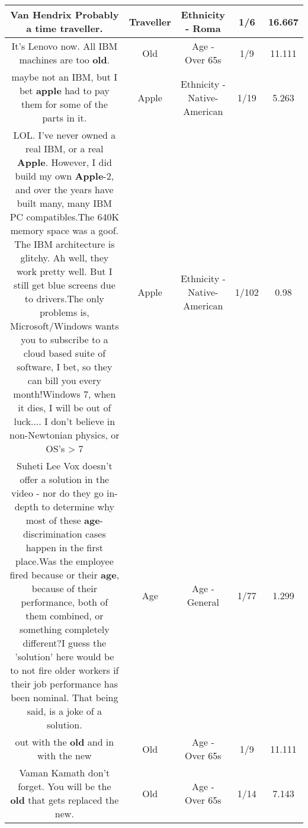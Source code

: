 \documentclass[11pt]{article}
\newlength\mylength
\begin{document}
\begin{center}
\begin{longtable}{|C{.65\mylength}|C{.30\mylength}|C{.12\mylength}|C{.12\mylength}|C{.12\mylength}|}
  \small Van Hendrix Probably a time \textbf{traveller}.\normalsize   & Traveller & Ethnicity - Roma & 1/6 & 16.667 \\  \hline
  \small It's Lenovo now. All IBM machines are too \textbf{old}.\normalsize   & Old & Age - Over 65s & 1/9 & 11.111 \\  \hline
  \small maybe not an IBM, but I bet \textbf{apple} had to pay them for some of the parts in it.\normalsize   & Apple & Ethnicity - Native-American & 1/19 & 5.263 \\  \hline
  \small LOL. I've never owned a real IBM, or a real \textbf{Apple}. However, I did build my own \textbf{Apple}-2, and over the years have built many, many IBM PC compatibles.The 640K memory space was a goof.  The IBM architecture is glitchy. Ah well, they work pretty well. But I still get blue screens due to drivers.The only problems is, Microsoft/Windows wants you to subscribe to a cloud based suite of software, I bet, so they can bill you every month!Windows 7, when it dies, I will be out of luck....  I don't believe in non-Newtonian physics, or OS's > 7\normalsize   & Apple & Ethnicity - Native-American & 1/102 & 0.98 \\  \hline
  \small Suheti Lee Vox doesn't offer a solution in the video - nor do they go in-depth to determine why most of these \textbf{age}-discrimination cases happen in the first place.Was the employee fired because or their \textbf{age}, because of their performance, both of them combined, or something completely different?I guess the 'solution' here would be to not fire older workers if their job performance has been nominal. That being said, is a joke of a solution.\normalsize   & Age & Age - General & 1/77 & 1.299 \\  \hline
  \small out with the \textbf{old} and in with the new\normalsize   & Old & Age - Over 65s & 1/9 & 11.111 \\  \hline
  \small Vaman Kamath don't forget. You will be the \textbf{old} that gets replaced the new.\normalsize   & Old & Age - Over 65s & 1/14 & 7.143 \\  \hline

\end{longtable}
\end{center}
\end{document}
